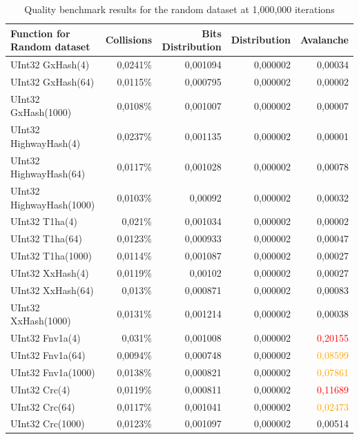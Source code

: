 \documentclass[10pt]{article}
\begin{document}
\begin{table}[H]
\centering
\begin{tabular}{|l|r|r|r|r|}
\hline
\textbf{Function for Random dataset} & \textbf{Collisions} & \textbf{Bits Distribution} & \textbf{Distribution} & \textbf{Avalanche} \\
\hline
UInt32 GxHash(4)            & 0,0241\% & 0,001094  & 0,000002 & 0,00034 \\
UInt32 GxHash(64)           & 0,0115\% & 0,000795  & 0,000002 & 0,00002 \\
UInt32 GxHash(1000)         & 0,0108\%  & 0,001007  & 0,000002 & 0,00007 \\
UInt32 HighwayHash(4)        & 0,0237\% & 0,001135  & 0,000002 & 0,00001 \\
UInt32 HighwayHash(64)       & 0,0117\% & 0,001028  & 0,000002 & 0,00078 \\
UInt32 HighwayHash(1000)     & 0,0103\% & 0,00092   & 0,000002 & 0,00032 \\
UInt32 T1ha(4)               & 0,021\%  & 0,001034  & 0,000002 & 0,00002 \\
UInt32 T1ha(64)              & 0,0123\% & 0,000933  & 0,000002 & 0,00047 \\
UInt32 T1ha(1000)            & 0,0114\% & 0,001087  & 0,000002 & 0,00027 \\
UInt32 XxHash(4)            & 0,0119\% & 0,00102   & 0,000002 & 0,00027 \\
UInt32 XxHash(64)           & 0,013\%  & 0,000871  & 0,000002 & 0,00083 \\
UInt32 XxHash(1000)         & 0,0131\% & 0,001214  & 0,000002 & 0,00038 \\
UInt32 Fnv1a(4)             & 0,031\%  & 0,001008  & 0,000002 & \textcolor{red}{0,20155} \\
UInt32 Fnv1a(64)            & 0,0094\% & 0,000748  & 0,000002 & \textcolor{orange}{0,08599} \\
UInt32 Fnv1a(1000)          & 0,0138\% & 0,000821  & 0,000002 & \textcolor{orange}{0,07861} \\
UInt32 Crc(4)               & 0,0119\% & 0,000811  & 0,000002 & \textcolor{red}{0,11689} \\
UInt32 Crc(64)              & 0,0117\% & 0,001041  & 0,000002 & \textcolor{orange}{0,02473} \\
UInt32 Crc(1000)            & 0,0123\% & 0,001097  & 0,000002 & 0,00514 \\
\hline
\end{tabular}
\caption{Quality benchmark results for the random dataset at 1,000,000 iterations}
\label{tab:quality-data-random}
\end{table}
    
\end{document}
